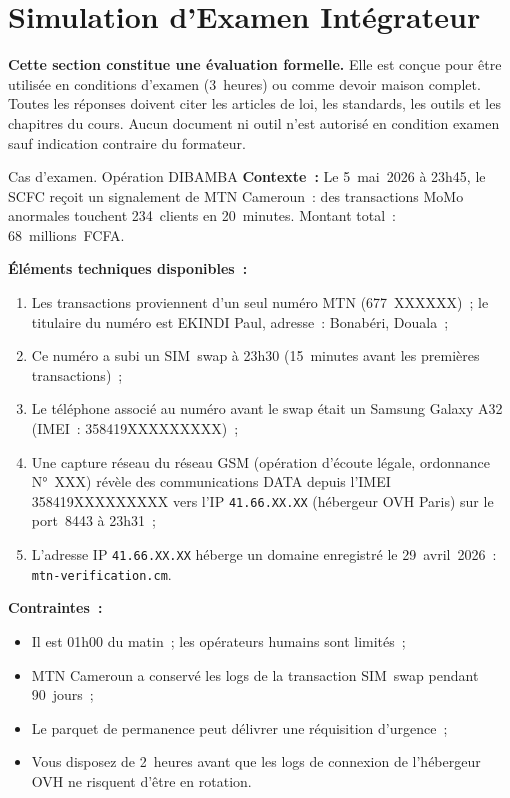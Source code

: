 \section{Simulation d'Examen Intégrateur}
\label{sec:simulation-examen}

\begin{boxalert}
\textbf{Cette section constitue une évaluation formelle.}
Elle est conçue pour être utilisée en conditions d'examen (3~heures)
ou comme devoir maison complet. Toutes les réponses doivent citer
les articles de loi, les standards, les outils et les chapitres
du cours. Aucun document ni outil n'est autorisé en condition examen
sauf indication contraire du formateur.
\end{boxalert}

\begin{boxscenario}{Cas d'examen. Opération DIBAMBA}
\textbf{Contexte~:} Le 5~mai~2026 à 23h45, le SCFC reçoit un
signalement de MTN Cameroun~: des transactions MoMo anormales
touchent 234~clients en 20~minutes. Montant total~: 68~millions~FCFA.

\textbf{Éléments techniques disponibles~:}
\begin{enumerate}
    \item Les transactions proviennent d'un seul numéro MTN
          (677~XXXXXX)~; le titulaire du numéro est EKINDI Paul,
          adresse~: Bonabéri, Douala~;
    \item Ce numéro a subi un SIM~swap à 23h30 (15~minutes avant
          les premières transactions)~;
    \item Le téléphone associé au numéro avant le swap était un
          Samsung Galaxy A32 (IMEI~: 358419XXXXXXXXX)~;
    \item Une capture réseau du réseau GSM (opération d'écoute
          légale, ordonnance N°~XXX) révèle des communications
          DATA depuis l'IMEI 358419XXXXXXXXX vers l'IP
          \texttt{41.66.XX.XX} (hébergeur OVH Paris) sur le
          port~8443 à 23h31~;
    \item L'adresse IP \texttt{41.66.XX.XX} héberge un domaine
          enregistré le 29~avril~2026~: \texttt{mtn-verification.cm}.
\end{enumerate}

\textbf{Contraintes~:}
\begin{itemize}
    \item Il est 01h00 du matin~; les opérateurs humains sont limités~;
    \item MTN Cameroun a conservé les logs de la transaction
          SIM~swap pendant 90~jours~;
    \item Le parquet de permanence peut délivrer une réquisition
          d'urgence~;
    \item Vous disposez de 2~heures avant que les logs de connexion
          de l'hébergeur OVH ne risquent d'être en rotation.
\end{itemize}
\end{boxscenario}

